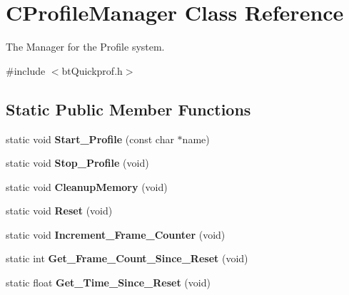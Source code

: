 \hypertarget{class_c_profile_manager}{\section{C\+Profile\+Manager Class Reference}
\label{class_c_profile_manager}
}


The Manager for the Profile system.  




{\ttfamily \#include $<$bt\+Quickprof.\+h$>$}

\subsection*{Static Public Member Functions}
\begin{DoxyCompactItemize}
\item 
\hypertarget{class_c_profile_manager_a9ee4ef7680a5d4244c10eb64c02fb47b}{static void {\bfseries Start\+\_\+\+Profile} (const char $\ast$name)}\label{class_c_profile_manager_a9ee4ef7680a5d4244c10eb64c02fb47b}

\item 
\hypertarget{class_c_profile_manager_aae6ebba99caa1d89fa5a019168db2e4d}{static void {\bfseries Stop\+\_\+\+Profile} (void)}\label{class_c_profile_manager_aae6ebba99caa1d89fa5a019168db2e4d}

\item 
\hypertarget{class_c_profile_manager_aad68cf5af2848a466e564ab0fe84babb}{static void {\bfseries Cleanup\+Memory} (void)}\label{class_c_profile_manager_aad68cf5af2848a466e564ab0fe84babb}

\item 
\hypertarget{class_c_profile_manager_a945351c8b86ec458b6976a79f0ea21e7}{static void {\bfseries Reset} (void)}\label{class_c_profile_manager_a945351c8b86ec458b6976a79f0ea21e7}

\item 
\hypertarget{class_c_profile_manager_a375c7bc9c8f1ed9c9c74be7ea14c7de7}{static void {\bfseries Increment\+\_\+\+Frame\+\_\+\+Counter} (void)}\label{class_c_profile_manager_a375c7bc9c8f1ed9c9c74be7ea14c7de7}

\item 
\hypertarget{class_c_profile_manager_a8d22ef534dccd484ed01838155dd6b1b}{static int {\bfseries Get\+\_\+\+Frame\+\_\+\+Count\+\_\+\+Since\+\_\+\+Reset} (void)}\label{class_c_profile_manager_a8d22ef534dccd484ed01838155dd6b1b}

\item 
\hypertarget{class_c_profile_manager_a6fee33f122aa1980191a7b6c4f6140c9}{static float {\bfseries Get\+\_\+\+Time\+\_\+\+Since\+\_\+\+Reset} (void)}\label{class_c_profile_manager_a6fee33f122aa1980191a7b6c4f6140c9}


\end{DoxyCompactItemize}
